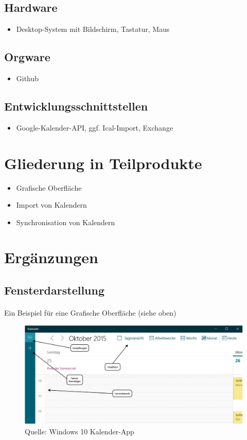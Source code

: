 \documentclass[a4paper]{article}
\begin{document}
    \subsection{Hardware}
	      \begin{itemize}
	      	\item Desktop-System mit Bildschirm, Tastatur, Maus
	      \end{itemize}
    \subsection{Orgware}
	      \begin{itemize}
					\item Github
	      \end{itemize}
    \subsection{Entwicklungsschnittstellen}
	      \begin{itemize}
	      	\item Google-Kalender-API, ggf. Ical-Import, Exchange
	      \end{itemize}

  \section{Gliederung in Teilprodukte}
    \begin{itemize}
      \item Grafische Oberfläche
		  \item Import von Kalendern
		  \item Synchronisation von Kalendern
    \end{itemize}
  \section{Ergänzungen}
  	\subsection{Fensterdarstellung}
  	\paragraph{}
  	Ein Beispiel für eine Grafische Oberfläche (siehe oben)
  	
  	
	\begin{figure}
		\centering
		\includegraphics[width=1.0\linewidth]{Fensterdarstellung}
		\caption{Quelle: Windows 10 Kalender-App}
		\label{Fensterdarstellung}
	\end{figure}
\end{document}

